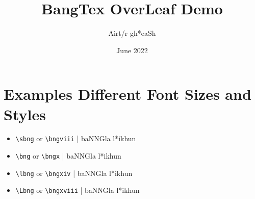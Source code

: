\documentclass{article}
\title{BangTex OverLeaf Demo}
\author{{\bng Airt/r \*gh*eaSh}}
\date{June 2022}
\begin{document}
\maketitle

\section{Examples Different Font Sizes and Styles}

\begin{itemize}

\item \verb+\sbng+ or \verb+\bngviii+ | {\sbng baNNGla \*l*ikhun}
\item \verb+\bng+ or \verb+\bngx+ | {\bng baNNGla \*l*ikhun}
\item \verb+\lbng+ or \verb+\bngxiv+ | {\lbng baNNGla \*l*ikhun}
\item \verb+\Lbng+ or \verb+\bngxviii+ | {\Lbng baNNGla \*l*ikhun}
 
\end{itemize}
\end{document}
